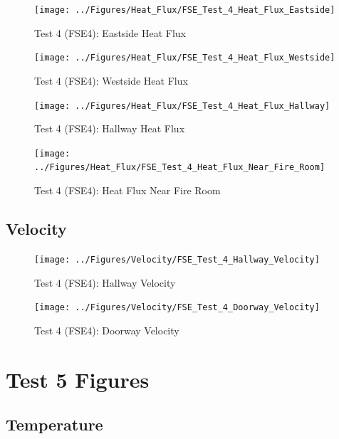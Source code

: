 \documentclass[12pt,oneside]{book}
\begin{document}
\begin{figure}[!ht]
	\texttt{[image: ../Figures/Heat\_Flux/FSE\_Test\_4\_Heat\_Flux\_Eastside]}
	\caption{Test 4 (FSE4): Eastside Heat Flux}
	\label{fig:Test_4_Eastside_Heat_Flux}
\end{figure}

\begin{figure}[!ht]
	\texttt{[image: ../Figures/Heat\_Flux/FSE\_Test\_4\_Heat\_Flux\_Westside]}
	\caption{Test 4 (FSE4): Westside Heat Flux}
	\label{fig:Test_4_Westside_Heat_Flux}
\end{figure}

\begin{figure}[!ht]
	\texttt{[image: ../Figures/Heat\_Flux/FSE\_Test\_4\_Heat\_Flux\_Hallway]}
	\caption{Test 4 (FSE4): Hallway Heat Flux}
	\label{fig:Test_4_Hallway_Heat_Flux}
\end{figure}

\begin{figure}[!ht]
	\texttt{[image: ../Figures/Heat\_Flux/FSE\_Test\_4\_Heat\_Flux\_Near\_Fire\_Room]}
	\caption{Test 4 (FSE4): Heat Flux Near Fire Room}
	\label{fig:Test_4_Heat_Flux_Near_Fire_Room}
\end{figure}

\subsection{Velocity}
\label{subsec:Velocity}

\begin{figure}[!ht]
	\texttt{[image: ../Figures/Velocity/FSE\_Test\_4\_Hallway\_Velocity]}
	\caption{Test 4 (FSE4): Hallway Velocity}
	\label{fig:Test_4_Hallway_Velocity}
\end{figure}

\begin{figure}[!ht]
	\texttt{[image: ../Figures/Velocity/FSE\_Test\_4\_Doorway\_Velocity]}
	\caption{Test 4 (FSE4): Doorway Velocity}
	\label{fig:Test_4_Doorway_Velocity}
\end{figure}

\clearpage

\section{Test 5 Figures}
\label{subsec:Test_5_Figures}

\subsection{Temperature}
\label{subsec:Temperature}
\end{document}
